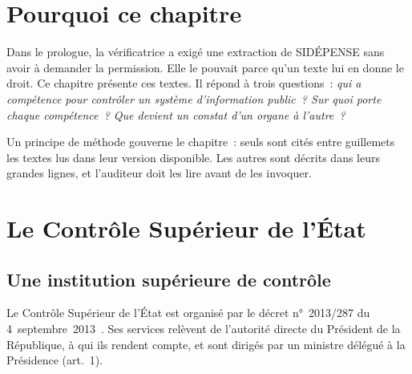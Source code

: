 \section*{Pourquoi ce chapitre}

Dans le prologue, la vérificatrice a exigé une extraction de SIDÉPENSE
sans avoir à demander la permission. Elle le pouvait parce qu'un texte
lui en donne le droit. Ce chapitre présente ces textes. Il répond à trois
questions~: \emph{qui a compétence pour contrôler un système
d'information public~? Sur quoi porte chaque compétence~? Que devient un
constat d'un organe à l'autre~?}

Un principe de méthode gouverne le chapitre~: seuls sont cités entre
guillemets les textes lus dans leur version disponible. Les autres sont
décrits dans leurs grandes lignes, et l'auditeur doit les lire avant de
les invoquer.

\separateur

\section{Le Contrôle Supérieur de l'État}
\label{sec:c04-consupe}

\subsection{Une institution supérieure de contrôle}

Le Contrôle Supérieur de l'État est organisé par le décret n°~2013/287 du
4~septembre~2013~\cite{decret2013287consupe}. Ses services relèvent de
l'autorité directe du Président de la République, à qui ils rendent
compte, et sont dirigés par un ministre délégué à la Présidence (art.~1).

